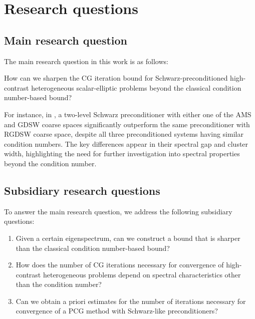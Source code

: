 \chapter{Research questions}\label{ch:questions}
\section{Main research question}
The main research question in this work is as follows:
\begin{researchq} \label{rq:main}
    \par
    How can we sharpen the CG iteration bound for Schwarz-preconditioned high-contrast heterogeneous scalar-elliptic problems beyond the classical condition number-based bound?
\end{researchq}
For instance, in \cite{ams_coarse_space_comp_study_Alves2024}, a two-level Schwarz preconditioner with either one of the AMS and GDSW coarse spaces significantly outperform the same preconditioner with RGDSW coarse space, despite all three preconditioned systems having similar condition numbers. The key differences appear in their spectral gap and cluster width, highlighting the need for further investigation into spectral properties beyond the condition number.

\section{Subsidiary research questions}
\begin{subsidiaryq} \label{rq:subsidiaries}
    To answer the main research question, we address the following subsidiary questions:
    \setlength\itemindent{1in}
    \begin{enumerate}[label=\textbf{Q\arabic*}, ref=\textbf{Q\arabic*}, leftmargin=1cm]
        \item\label{rq:subsidiary:heuristic} Given a certain eigenspectrum, can we construct a bound that is sharper than the classical condition number-based bound?
        \item\label{rq:subsidiary:measures} How does the number of CG iterations necessary for convergence of high-contrast heterogeneous problems depend on spectral characteristics other than the condition number?
        \item\label{rq:subsidiary:preconditioners} Can we obtain a priori estimates for the number of iterations necessary for convergence of a PCG method with Schwarz-like preconditioners?
    \end{enumerate}
\end{subsidiaryq}

